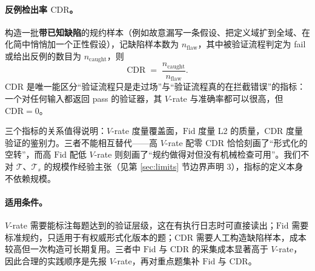 \paragraph{反例检出率 $\mathrm{CDR}$。}构造一批\textbf{带已知缺陷}的规约样本（例如故意漏写一条假设、把定义域扩到全域、在化简中悄悄加一个正性假设），记缺陷样本数为 $n_{\text{flaw}}$，其中被验证流程判定为 fail 或给出反例的数目为 $n_{\text{caught}}$，则
\[
\mathrm{CDR} \;=\; \frac{n_{\text{caught}}}{n_{\text{flaw}}} .
\]
$\mathrm{CDR}$ 是唯一能区分“验证流程只是走过场”与“验证流程真的在拦截错误”的指标：一个对任何输入都返回 pass 的验证器，其 $V$-rate 与准确率都可以很高，但 $\mathrm{CDR} = 0$。

三个指标的关系值得说明：$V$-rate 度量覆盖面，$\mathrm{Fid}$ 度量 L2 的质量，$\mathrm{CDR}$ 度量验证的鉴别力。三者不能相互替代——高 $V$-rate 配零 $\mathrm{CDR}$ 恰恰刻画了“形式化的空转”，而高 $\mathrm{Fid}$ 配低 $V$-rate 则刻画了“规约做得对但没有机械检查可用”。我们不对 $\mathcal{T}$、$\mathcal{T}_s$ 的规模作经验主张（见第 \ref{sec:limits} 节边界声明 3），指标的定义本身不依赖规模。

\paragraph{适用条件。}$V$-rate 需要能标注每题达到的验证层级，这在有执行日志时可直接读出；$\mathrm{Fid}$ 需要标准规约，只适用于有权威形式化版本的题；$\mathrm{CDR}$ 需要人工构造缺陷样本，成本较高但一次构造可长期复用。三者中 $\mathrm{Fid}$ 与 $\mathrm{CDR}$ 的采集成本显著高于 $V$-rate，因此合理的实践顺序是先报 $V$-rate，再对重点题集补 $\mathrm{Fid}$ 与 $\mathrm{CDR}$。
